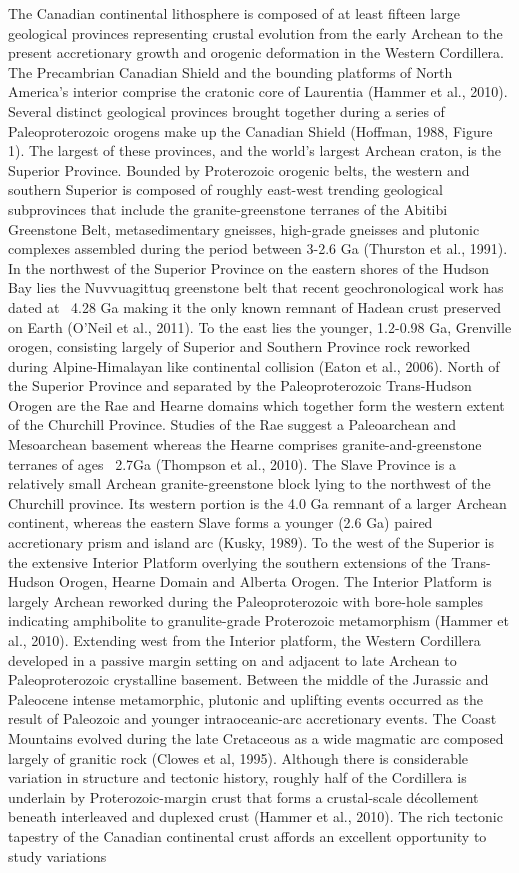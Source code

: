 \documentclass[review]{elsarticle}
\begin{document}
The Canadian continental lithosphere is composed of at least fifteen large geological provinces representing crustal evolution from the early Archean to the present accretionary growth and orogenic deformation in the Western Cordillera. The Precambrian Canadian Shield and the bounding platforms of North America's interior comprise the cratonic core of Laurentia (Hammer et al., 2010). Several distinct geological provinces brought together during a series of Paleoproterozoic orogens make up the Canadian Shield (Hoffman, 1988, Figure 1). The largest of these provinces, and the world's largest Archean craton, is the Superior Province. Bounded by Proterozoic orogenic belts, the western and southern Superior is composed of roughly east-west trending geological subprovinces that include the granite-greenstone terranes of the Abitibi Greenstone Belt, metasedimentary gneisses, high-grade gneisses and plutonic complexes assembled during the period between 3-2.6 Ga (Thurston et al., 1991). In the northwest of the Superior Province on the eastern shores of the Hudson Bay lies the Nuvvuagittuq greenstone belt that recent geochronological work has dated at ~4.28 Ga making it the only known remnant of Hadean crust preserved on Earth (O'Neil et al., 2011). To the east lies the younger, 1.2-0.98 Ga, Grenville orogen, consisting largely of Superior and Southern Province rock reworked during Alpine-Himalayan like continental collision (Eaton et al., 2006). North of the Superior Province and separated by the Paleoproterozoic Trans-Hudson Orogen are the Rae and Hearne domains which together form the western extent of the Churchill Province. Studies of the Rae suggest a Paleoarchean and Mesoarchean basement whereas the Hearne comprises granite-and-greenstone terranes of ages ~2.7Ga (Thompson et al., 2010). The Slave Province is a relatively small Archean granite-greenstone block lying to the northwest of the Churchill province. Its western portion is the 4.0 Ga remnant of a larger Archean continent, whereas the eastern Slave forms a younger (2.6 Ga) paired accretionary prism and island arc (Kusky, 1989). To the west of the Superior is the extensive Interior Platform overlying the southern extensions of the Trans-Hudson Orogen, Hearne Domain and Alberta Orogen. The Interior Platform is largely Archean reworked during the Paleoproterozoic with bore-hole samples indicating amphibolite to granulite-grade Proterozoic metamorphism (Hammer et al., 2010). Extending west from the Interior platform, the Western Cordillera developed in a passive margin setting on and adjacent to late Archean to Paleoproterozoic crystalline basement. Between the middle of the Jurassic and Paleocene intense metamorphic, plutonic and uplifting events occurred as the result of Paleozoic and younger intraoceanic-arc accretionary events. The Coast Mountains evolved during the late Cretaceous as a wide magmatic arc composed largely of granitic rock (Clowes et al, 1995). Although there is considerable variation in structure and tectonic history, roughly half of the Cordillera is underlain by Proterozoic-margin crust that forms a crustal-scale d\'{e}collement beneath interleaved and duplexed crust (Hammer et al., 2010). The rich tectonic tapestry of the Canadian continental crust affords an excellent opportunity to study variations 
\end{document}
